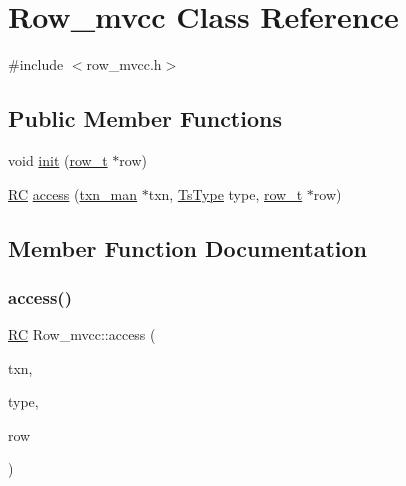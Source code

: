 \hypertarget{classRow__mvcc}{}\section{Row\+\_\+mvcc Class Reference}
\label{classRow__mvcc}


{\ttfamily \#include $<$row\+\_\+mvcc.\+h$>$}

\subsection*{Public Member Functions}
\begin{DoxyCompactItemize}
\item 
void \hyperlink{classRow__mvcc_a4b734f09ce0db28fdd1a1d9e861a1987}{init} (\hyperlink{classrow__t}{row\+\_\+t} $\ast$row)
\item 
\hyperlink{global_8h_a78c49a674c810fdd03d20432f7be864a}{RC} \hyperlink{classRow__mvcc_a7fa37f67bf96fb02bd8da87855c95b6d}{access} (\hyperlink{classtxn__man}{txn\+\_\+man} $\ast$txn, \hyperlink{global_8h_a1a7f6ca1462293fe053b5ae74a6c4eda}{Ts\+Type} type, \hyperlink{classrow__t}{row\+\_\+t} $\ast$row)
\end{DoxyCompactItemize}


\subsection{Member Function Documentation}
\mbox{\label{classRow__mvcc_a7fa37f67bf96fb02bd8da87855c95b6d}} 
\subsubsection{\texorpdfstring{access()}{access()}}
{\footnotesize\ttfamily \hyperlink{global_8h_a78c49a674c810fdd03d20432f7be864a}{RC} Row\+\_\+mvcc\+::access (\begin{DoxyParamCaption}\item[{\hyperlink{classtxn__man}{txn\+\_\+man} $\ast$}]{txn,  }\item[{\hyperlink{global_8h_a1a7f6ca1462293fe053b5ae74a6c4eda}{Ts\+Type}}]{type,  }\item[{\hyperlink{classrow__t}{row\+\_\+t} $\ast$}]{row }\end{DoxyParamCaption})}

\mbox{\label{classRow__mvcc_a4b734f09ce0db28fdd1a1d9e861a1987}} 
